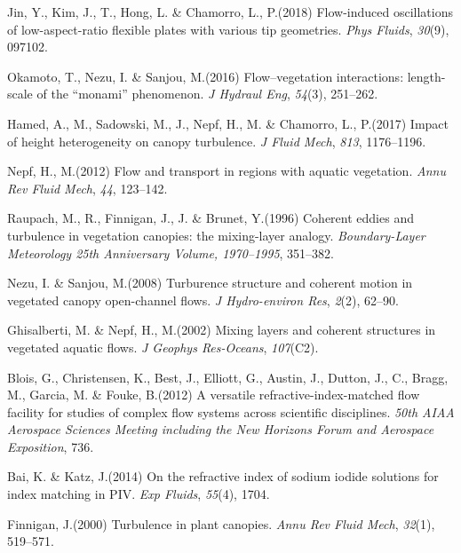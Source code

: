 \documentclass[lineno,authoryear]{FLO_v1}%
\theoremstyle{definition}
\begin{document}
\begin{Backmatter}
\begin{thebibliography}{}
Jin, Y., Kim, J., T., Hong, L. {\&} Chamorro, L., P.(2018)
Flow-induced oscillations of low-aspect-ratio flexible plates with various tip geometries.
	\textit{Phys Fluids}, \textit{30}(9), 097102.

Okamoto, T., Nezu, I. {\&} Sanjou, M.(2016)
Flow--vegetation interactions: length-scale of the “monami” phenomenon.
	\textit{J Hydraul Eng}, \textit{54}(3), 251--262.

Hamed, A., M., Sadowski, M., J., Nepf, H., M. {\&} Chamorro, L., P.(2017)
Impact of height heterogeneity on canopy turbulence.
	\textit{J Fluid Mech}, \textit{813}, 1176--1196.

Nepf, H., M.(2012)
Flow and transport in regions with aquatic vegetation.
	\textit{Annu Rev Fluid Mech}, \textit{44}, 123--142.

Raupach, M., R., Finnigan, J., J. {\&} Brunet, Y.(1996)
Coherent eddies and turbulence in vegetation canopies: the mixing-layer analogy.
	\textit{Boundary-Layer Meteorology 25th Anniversary Volume, 1970--1995}, 351--382.

Nezu, I. {\&} Sanjou, M.(2008)
Turburence structure and coherent motion in vegetated canopy open-channel flows.
	\textit{J Hydro-environ Res}, \textit{2}(2), 62--90.

Ghisalberti, M. {\&} Nepf, H., M.(2002)
Mixing layers and coherent structures in vegetated aquatic flows.
	\textit{J Geophys Res-Oceans}, \textit{107}(C2).

Blois, G., Christensen, K., Best, J., Elliott, G., Austin, J., Dutton, J., C., Bragg, M., Garcia, M. {\&} Fouke, B.(2012)
A versatile refractive-index-matched flow facility for studies of complex flow systems across scientific disciplines.
	\textit{50th AIAA Aerospace Sciences Meeting including the New Horizons Forum and Aerospace Exposition}, 736.

Bai, K. {\&} Katz, J.(2014)
On the refractive index of sodium iodide solutions for index matching in PIV.
	\textit{Exp Fluids}, \textit{55}(4), 1704.

Finnigan, J.(2000)
Turbulence in plant canopies.
	\textit{Annu Rev Fluid Mech}, \textit{32}(1), 519--571.


\end{thebibliography}
\end{Backmatter}
\end{document}
